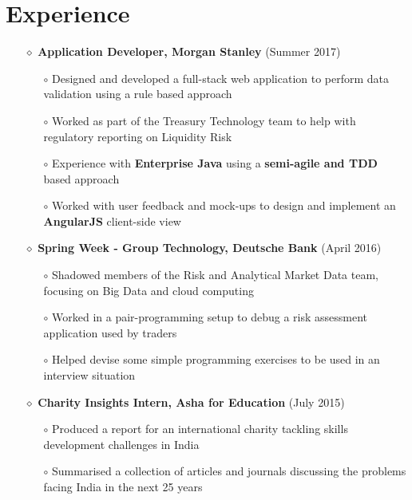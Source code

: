 \documentclass[a4paper]{article}
\begin{document}
\vspace{-10pt}
\section*{Experience}
\vspace{-7pt}

\begin{itemize} 

\item[$\diamond$] \textbf{Application Developer, Morgan Stanley} (Summer 2017)
\begin{itemize}
\item[$\circ$] Designed and developed a full-stack web application to perform data validation using a rule based approach
\item[$\circ$] Worked as part of the Treasury Technology team to help with regulatory reporting on Liquidity Risk
\item[$\circ$] Experience with \textbf{Enterprise Java} using a \textbf{semi-agile and TDD} based approach
\item[$\circ$] Worked with user feedback and mock-ups to design and implement an \textbf{AngularJS} client-side view
\end{itemize}

\item[$\diamond$] \textbf{Spring Week - Group Technology, Deutsche Bank} (April 2016)
\begin{itemize}
\item[$\circ$] Shadowed members of the Risk and Analytical Market Data team, focusing on Big Data and cloud computing
\item[$\circ$] Worked in a pair-programming setup to debug a risk assessment application used by traders 
\item[$\circ$] Helped devise some simple programming exercises to be used in an interview situation
\end{itemize}

\item[$\diamond$] \textbf{Charity Insights Intern, Asha for Education} (July 2015)
\begin{itemize}
\item[$\circ$] Produced a report for an international charity tackling skills development challenges in India
\item[$\circ$] Summarised a collection of articles and journals discussing the problems facing India in the next 25 years
\end{itemize}

\end{itemize}
\end{document}
